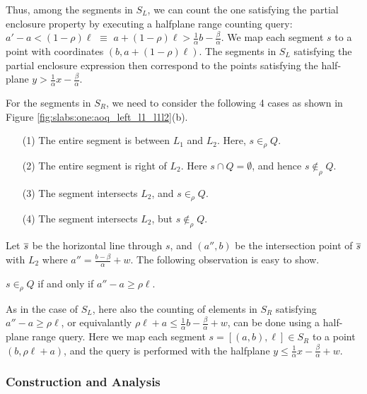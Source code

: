 Thus, among the segments in $S_L$, we can count the one satisfying the 
partial enclosure property by executing a halfplane range counting query:
$a' - a < (1 - \rho)\ell$ $\equiv$ $a + (1 - \rho)\ell > \frac{1}{\alpha} b - 
\frac{\beta}{\alpha}$. We map each segment $s$ to a point with coordinates 
$(b, a + (1-\rho)\ell)$. The segments in $S_L$ 
satisfying the partial enclosure expression then correspond to the points 
satisfying the half-plane $y > \frac{1}{\alpha}x - \frac{\beta}{\alpha}$.


For the segments in $S_R$, we need to consider the following 
4 cases as shown in Figure \ref{fig:slabs:one:aoq_left_l1_l1l2}(b).



\begin{itemize}
 \item[(1)] The entire segment is between $L_1$ and $L_2$. Here, $s \in_\rho Q$.
 \item[(2)] The entire segment is right of $L_2$. Here $s \cap Q = \emptyset$, 
 and hence $s \not \in_\rho Q$.
 \item[(3)] The segment intersects $L_2$, and $s \in_\rho Q$.
 \item[(4)] The segment intersects $L_2$, but $s \not \in_\rho Q$.
\end{itemize}
Let $\overline{s}$ be the horizontal line through $s$, and $(a'', b)$ be the 
intersection point of $\overline{s}$ with $L_2$ where $a'' = \frac{b - 
\beta}{\alpha}
 + w$. The following observation is easy to show.
\begin{observation} 
$s \in_\rho Q$ if and only if 
 $a'' - a \geq \rho \ell$.
\end{observation}
As in the case of $S_L$, here also the counting of elements in $S_R$ 
satisfying $a'' - a \geq \rho \ell$, or equivalantly $\rho \ell + a 
\leq \frac{1}{\alpha} b - \frac{\beta}{\alpha} + w$, can be done using 
a half-plane range query. Here we map each segment $s=[(a,b),\ell]\in 
S_R$ to a point $(b, \rho \ell + a)$, and the query is performed with 
the halfplane  $y \leq \frac{1}{\alpha} x - \frac{\beta}{\alpha} + w$.

\subsubsection{Construction and Analysis}
\label{:slabs:one:analysis}

